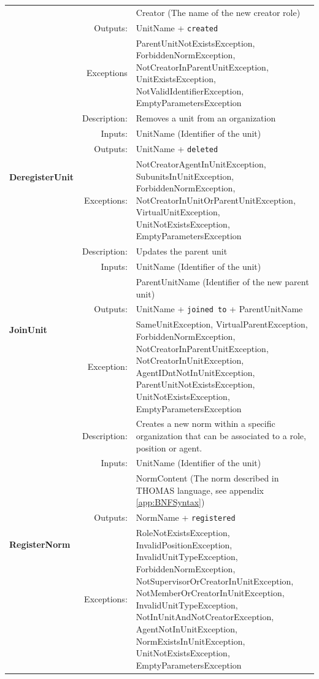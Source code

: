 \begin{longtable}{|p{3cm}|r|p{8.5cm}|}
    &  & Creator (The name of the new creator role) \\ \cline{2-3}
    & Outputs:     & UnitName + \texttt{created} \\ \cline{2-3}
    & Exceptions   & ParentUnitNotExistsException, ForbiddenNormException, NotCreatorInParentUnitException, UnitExistsException, NotValidIdentifierException, EmptyParametersException \\ \hline
  \hline
  \multirow{4}{*}{\textbf{DeregisterUnit}} & Description: & Removes a unit from an organization \\ \cline{2-3}
    & Inputs: & UnitName (Identifier of the unit) \\ \cline{2-3}
    & Outputs:     & UnitName + \texttt{deleted} \\ \cline{2-3}
    & Exceptions:  & NotCreatorAgentInUnitException, SubunitsInUnitException, ForbiddenNormException, NotCreatorInUnitOrParentUnitException, VirtualUnitException, UnitNotExistsException, EmptyParametersException \\ \hline
  \hline
  \multirow{5}{*}{\textbf{JoinUnit}} & Description: & Updates the parent unit \\ \cline{2-3}
    & Inputs: & UnitName (Identifier of the unit) \\ \cline{3-3}
    &  & ParentUnitName (Identifier of the new parent unit) \\ \cline{2-3}
    & Outputs:     & UnitName + \texttt{joined to} + ParentUnitName \\ \cline{2-3}
    & Exception:   & SameUnitException, VirtualParentException, ForbiddenNormException, NotCreatorInParentUnitException, NotCreatorInUnitException, AgentIDntNotInUnitException, ParentUnitNotExistsException, UnitNotExistsException, EmptyParametersException \\ \hline
  \hline
  \multirow{5}{*}{\textbf{RegisterNorm}} & Description: & Creates a new norm within a specific organization that can be associated to a role, position or agent. \\ \cline{2-3}
    & Inputs: & UnitName (Identifier of the unit) \\ \cline{3-3}
    &  & NormContent (The norm described in THOMAS language, see appendix \ref{app:BNFSyntax}) \\ \cline{2-3}
    & Outputs:     & NormName + \texttt{registered} \\ \cline{2-3}
    & Exceptions:  & RoleNotExistsException, InvalidPositionException, InvalidUnitTypeException, ForbiddenNormException, NotSupervisorOrCreatorInUnitException, NotMemberOrCreatorInUnitException, InvalidUnitTypeException, NotInUnitAndNotCreatorException, AgentNotInUnitException, NormExistsInUnitException, UnitNotExistsException, EmptyParametersException \\ \hline

\end{longtable}
